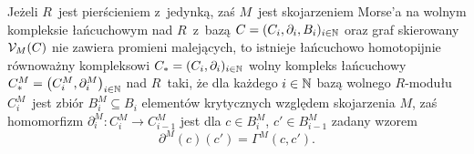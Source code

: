\begin{tw}\label{tw-glowne_tw_nsk_algebraicznej_dyskretnej_teorii_morsea}
Jeżeli $R$~jest pierścieniem z~jedynką, zaś $M$~jest skojarzeniem Morse'a na wolnym kompleksie łańcuchowym nad $R$~z~bazą $C=(C_i,\partial_i,B_i)_{i\in\mathbb{N}}$ oraz graf skierowany $\mathcal{V}_M(C)$ nie zawiera promieni malejących, to istnieje łańcuchowo homotopijnie równoważny kompleksowi \mbox{$C_*=(C_i,\partial_i)_{i\in\mathbb{N}}$} wolny kompleks łańcuchowy \mbox{$C_*^M=\bigl(C_i^M,\partial_i^M\bigr)_{i\in\mathbb{N}}$} nad $R$~taki, że dla każdego $i\in\mathbb{N}$ bazą wolnego $R$-modułu $C_i^M$~jest zbiór $B_i^M\subseteq B_i$ elementów krytycznych względem skojarzenia $M$, zaś homomorfizm $\partial_i^M\colon C_i^M\to C_{i-1}^M$ jest dla $c\in B_i^M$, $c'\in B_{i-1}^M$ zadany wzorem \[\partial^M(c)(c')=\Gamma^M(c,c').\]
\end{tw}
